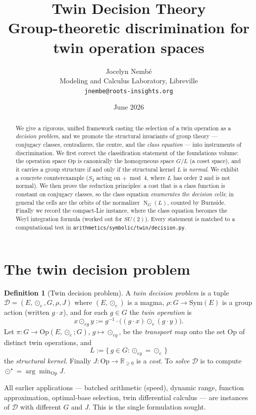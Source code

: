 \documentclass[11pt,a4paper]{article}
\title{\textbf{Twin Decision Theory}\\[0.3em]
\large Group-theoretic discrimination for twin operation spaces}
\author{Jocelyn Nemb\'e \\
\small Modeling and Calculus Laboratory, Libreville \\
\small \texttt{jnembe@roots-insights.org}}
\date{June 2026}
\newcommand{\Op}{\mathrm{Op}}
\newcommand{\R}{\mathbb{R}}
\newcommand{\code}[1]{\texttt{#1}}
\DeclareMathOperator{\Norm}{N}
\theoremstyle{plain}
\theoremstyle{definition}
\newtheorem{definition}[theorem]{Definition}
\theoremstyle{remark}
\begin{document}
\maketitle

\begin{abstract}
\noindent
We give a rigorous, unified framework casting the selection of a twin operation
as a \emph{decision problem}, and we promote the structural invariants of group
theory --- conjugacy classes, centralizers, the centre, and the
\emph{class equation} --- into instruments of discrimination. We first correct
the classification statement of the foundations volume: the operation space
$\Op$ is canonically the homogeneous space $G/L$ (a coset space), and it carries
a group structure if and only if the structural kernel $L$ is \emph{normal}. We
exhibit a concrete counterexample ($S_4$ acting on $+\bmod 4$, where $L$ has
order $2$ and is not normal). We then prove the reduction principles: a cost
that is a class function is constant on conjugacy classes, so the class equation
\emph{enumerates the decision cells}; in general the cells are the orbits of the
normalizer $\Norm_G(L)$, counted by Burnside. Finally we record the compact-Lie
instance, where the class equation becomes the Weyl integration formula
(worked out for $SU(2)$). Every statement is matched to a computational test in
\code{arithmetics/symbolic/twin/decision.py}.
\end{abstract}

\section{The twin decision problem}

\begin{definition}[Twin decision problem]
A \emph{twin decision problem} is a tuple $\mathcal{D} = (E, \odot_e, G, \rho, J)$
where $(E,\odot_e)$ is a magma, $\rho : G \to \mathrm{Sym}(E)$ is a group action
(written $g\cdot x$), and for each $g\in G$ the \emph{twin operation} is
\[
x \odot_{eg} y := g^{-1}\cdot\bigl((g\cdot x)\odot_e(g\cdot y)\bigr).
\]
Let $\pi : G \to \Op(E,\odot_e;G)$, $g\mapsto \odot_{eg}$, be the
\emph{transport map} onto the set $\Op$ of distinct twin operations, and
\[
L := \{\,g\in G : \odot_{eg} = \odot_e\,\}
\]
the \emph{structural kernel}. Finally $J : \Op \to \R_{\ge 0}$ is a \emph{cost}.
To \emph{solve} $\mathcal{D}$ is to compute $\odot^\star = \arg\min_{\Op} J$.
\end{definition}

All earlier applications --- batched arithmetic (speed), dynamic range,
function approximation, optimal-base selection, twin differential calculus ---
are instances of $\mathcal{D}$ with different $G$ and $J$. This is the single
formulation sought.
\end{document}
